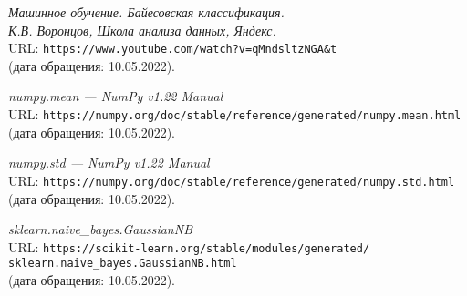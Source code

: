 \begin{thebibliography}{99}
{\itshape Машинное обучение. Байесовская классификация.\\К.В. Воронцов, Школа анализа данных, Яндекс.}\\
URL: \texttt{https://www.youtube.com/watch?v=qMndsltzNGA\&t}\\
(дата обращения: 10.05.2022).

{\itshape numpy.mean --- NumPy v1.22 Manual}\\
URL: \texttt{https://numpy.org/doc/stable/reference/generated/numpy.mean.html}\\
(дата обращения: 10.05.2022).

{\itshape numpy.std --- NumPy v1.22 Manual}\\
URL: \texttt{https://numpy.org/doc/stable/reference/generated/numpy.std.html}\\
(дата обращения: 10.05.2022).

{\itshape sklearn.naive\_bayes.GaussianNB}\\
URL: \texttt{https://scikit-learn.org/stable/modules/generated/\\sklearn.naive\_bayes.GaussianNB.html}\\
(дата обращения: 10.05.2022).

\end{thebibliography}
\pagebreak

